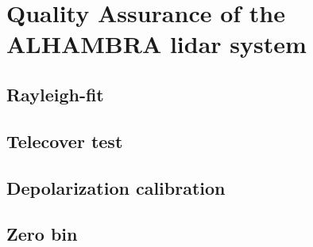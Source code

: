 \chapter{Quality Assurance of the ALHAMBRA lidar system}
\label{sect::devs01_chapter3}

\section{Rayleigh-fit}
\label{sect::devs01_chapter3_ray}

\section{Telecover test}
\label{sect::devs01_chapter3_telecover}

\section{Depolarization calibration}
\label{sect::devs01_chapter3_depo}

\section{Zero bin}
\label{sect::devs01_chapter3_zerobin}